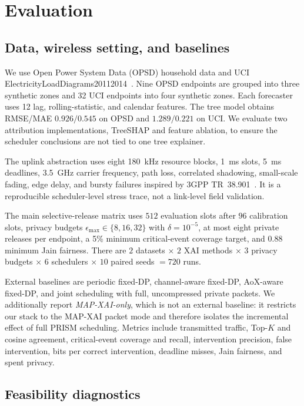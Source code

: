 \documentclass[conference]{IEEEtran}
\newcommand{\mapxai}{MAP-XAI}
\begin{document}
\section{Evaluation}

\subsection{Data, wireless setting, and baselines}

We use Open Power System Data (OPSD) household data and UCI
ElectricityLoadDiagrams20112014~\cite{opsd2020household,uci2015eld}.
Nine OPSD endpoints are grouped into three synthetic zones and 32 UCI
endpoints into four synthetic zones. Each forecaster uses 12 lag,
rolling-statistic, and calendar features. The tree model obtains
RMSE/MAE $0.926/0.545$ on OPSD and $1.289/0.221$ on UCI. We evaluate two
attribution implementations, TreeSHAP and feature ablation, to ensure the
scheduler conclusions are not tied to one tree explainer.

The uplink abstraction uses eight 180~kHz resource blocks, 1~ms slots,
5~ms deadlines, 3.5~GHz carrier frequency, path loss, correlated
shadowing, small-scale fading, edge delay, and bursty failures inspired
by 3GPP TR~38.901~\cite{3gpp38901}. It is a reproducible
scheduler-level stress trace, not a link-level field validation.

The main selective-release matrix uses $512$ evaluation slots after $96$
calibration slots, privacy budgets $\epsilon_{\max}\in\{8,16,32\}$ with
$\delta=10^{-5}$, at most eight private releases per endpoint, a 5\%
minimum critical-event coverage target, and 0.88 minimum Jain fairness.
There are $2$ datasets $\times$ $2$ XAI methods $\times$ $3$ privacy
budgets $\times$ $6$ schedulers $\times$ $10$ paired seeds $=720$ runs.

External baselines are periodic fixed-DP, channel-aware fixed-DP,
AoX-aware fixed-DP, and joint scheduling with full, uncompressed private
packets. We additionally report \emph{MAP-XAI-only}, which is not an
external baseline: it restricts our stack to the \mapxai{} packet mode
and therefore isolates the incremental effect of full PRISM scheduling.
Metrics include transmitted traffic, Top-$K$ and cosine agreement,
critical-event coverage and recall, intervention precision, false
intervention, bits per correct intervention, deadline misses, Jain
fairness, and spent privacy.

\subsection{Feasibility diagnostics}
\end{document}
